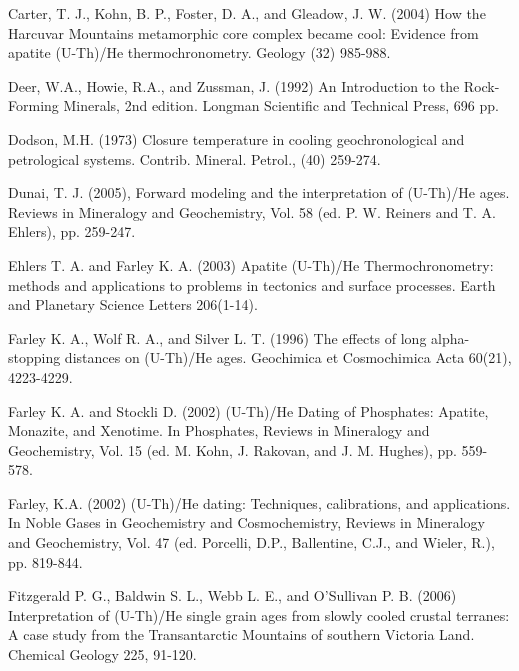 \documentclass{article}
\begin{document}
\begin{description}
 
\item Carter, T. J., Kohn, B. P., Foster, D. A., and Gleadow, J. W. 
 (2004) How the Harcuvar Mountains metamorphic core complex became
 cool: Evidence from apatite (U-Th)/He thermochronometry. Geology
 (32) 985-988.

\item Deer, W.A., Howie, R.A., and Zussman, J. (1992) An Introduction
 to the Rock-Forming Minerals, 2nd edition. Longman Scientific and
 Technical Press, 696 pp.
 
\item Dodson, M.H. (1973) Closure temperature in cooling
 geochronological and petrological systems. Contrib. Mineral. 
 Petrol., (40) 259-274.

\item Dunai, T. J. (2005), Forward modeling and the interpretation 
of (U-Th)/He ages. Reviews in Mineralogy and Geochemistry, Vol. 58 
(ed. P. W. Reiners and T. A. Ehlers), pp. 259-247.

\item Ehlers T. A. and Farley K. A. (2003) Apatite (U-Th)/He
Thermochronometry: methods and applications to problems in tectonics
and surface processes. Earth and Planetary Science Letters 206(1-14).

\item Farley K. A., Wolf R. A., and Silver L. T. (1996) The effects of
long alpha-stopping distances on (U-Th)/He ages. Geochimica et
Cosmochimica Acta 60(21), 4223-4229.

\item Farley K. A. and Stockli D. (2002) (U-Th)/He Dating of
Phosphates: Apatite, Monazite, and Xenotime. In Phosphates, Reviews
in Mineralogy and Geochemistry, Vol. 15 (ed. M. Kohn, J. Rakovan, and
J. M. Hughes), pp. 559-578.

\item Farley, K.A. (2002) (U-Th)/He dating: Techniques, calibrations,
and applications. In Noble Gases in Geochemistry and Cosmochemistry,
Reviews in Mineralogy and Geochemistry, Vol. 47 (ed. Porcelli, D.P.,
Ballentine, C.J., and Wieler, R.), pp. 819-844.

\item Fitzgerald P. G., Baldwin S. L., Webb L. E., and O'Sullivan
P. B. (2006) Interpretation of (U-Th)/He single grain ages from slowly
cooled crustal terranes: A case study from the Transantarctic
Mountains of southern Victoria Land. Chemical Geology 225, 91-120.


\end{description}
\end{document}

